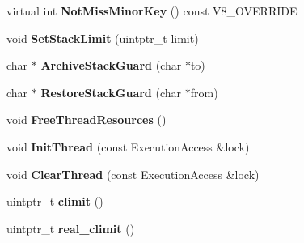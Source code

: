 \begin{DoxyCompactItemize}
\item 
\hypertarget{classv8_1_1internal_1_1_v8___f_i_n_a_l_abc0e5446ba661fc95fde9fa79f11918e}{}virtual int {\bfseries Not\+Miss\+Minor\+Key} () const V8\+\_\+\+O\+V\+E\+R\+R\+I\+D\+E\label{classv8_1_1internal_1_1_v8___f_i_n_a_l_abc0e5446ba661fc95fde9fa79f11918e}

\item 
\hypertarget{classv8_1_1internal_1_1_v8___f_i_n_a_l_a965ac1de3a46ae3f12913cb84843958b}{}void {\bfseries Set\+Stack\+Limit} (uintptr\+\_\+t limit)\label{classv8_1_1internal_1_1_v8___f_i_n_a_l_a965ac1de3a46ae3f12913cb84843958b}

\item 
\hypertarget{classv8_1_1internal_1_1_v8___f_i_n_a_l_a2ef9641b49f06da1ccbb7cc410f96e3e}{}char $\ast$ {\bfseries Archive\+Stack\+Guard} (char $\ast$to)\label{classv8_1_1internal_1_1_v8___f_i_n_a_l_a2ef9641b49f06da1ccbb7cc410f96e3e}

\item 
\hypertarget{classv8_1_1internal_1_1_v8___f_i_n_a_l_a86a4da77f0bcf44ca7f368c4f55c39d0}{}char $\ast$ {\bfseries Restore\+Stack\+Guard} (char $\ast$from)\label{classv8_1_1internal_1_1_v8___f_i_n_a_l_a86a4da77f0bcf44ca7f368c4f55c39d0}

\item 
\hypertarget{classv8_1_1internal_1_1_v8___f_i_n_a_l_aca549edfb8424152d2cf58ae9d79afbc}{}void {\bfseries Free\+Thread\+Resources} ()\label{classv8_1_1internal_1_1_v8___f_i_n_a_l_aca549edfb8424152d2cf58ae9d79afbc}

\item 
\hypertarget{classv8_1_1internal_1_1_v8___f_i_n_a_l_a74949fa2d214129fc0ebc79c9e3d7c36}{}void {\bfseries Init\+Thread} (const Execution\+Access \&lock)\label{classv8_1_1internal_1_1_v8___f_i_n_a_l_a74949fa2d214129fc0ebc79c9e3d7c36}

\item 
\hypertarget{classv8_1_1internal_1_1_v8___f_i_n_a_l_a6455ea2d504751ee13c176d4b702d012}{}void {\bfseries Clear\+Thread} (const Execution\+Access \&lock)\label{classv8_1_1internal_1_1_v8___f_i_n_a_l_a6455ea2d504751ee13c176d4b702d012}

\item 
\hypertarget{classv8_1_1internal_1_1_v8___f_i_n_a_l_aac9964f885702b4266c9c2f948b737ed}{}uintptr\+\_\+t {\bfseries climit} ()\label{classv8_1_1internal_1_1_v8___f_i_n_a_l_aac9964f885702b4266c9c2f948b737ed}

\item 
\hypertarget{classv8_1_1internal_1_1_v8___f_i_n_a_l_ac5a7f52ad4223f85f007b83725263023}{}uintptr\+\_\+t {\bfseries real\+\_\+climit} ()\label{classv8_1_1internal_1_1_v8___f_i_n_a_l_ac5a7f52ad4223f85f007b83725263023}


\end{DoxyCompactItemize}
